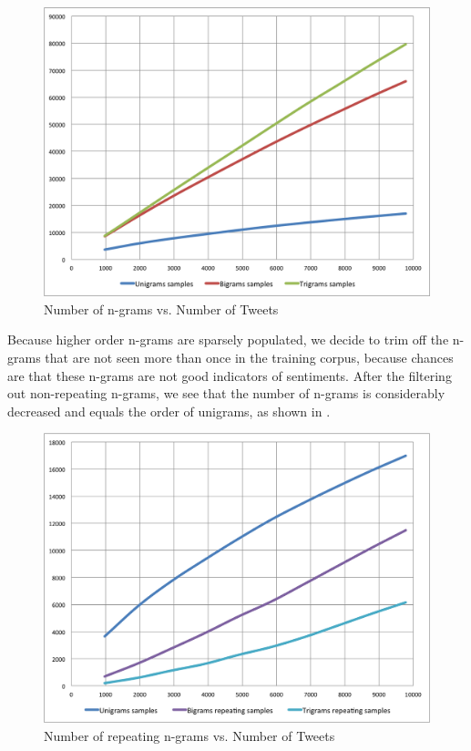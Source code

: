 \begin{figure}[h!]
\centering
\includegraphics[width=\textwidth]{img/Ngrams_dist_1.png}
\caption{Number of n-grams vs. Number of Tweets}
\label{fig:ngrams_dist_1}
\end{figure}

Because higher order n-grams are sparsely populated, we decide to trim off the n-grams that are not seen more than once in the training corpus, because chances are that these n-grams are not good indicators of sentiments. After the filtering out non-repeating n-grams, we see that the number of n-grams is considerably decreased and equals the order of unigrams, as shown in .

\begin{figure}[h!]
\centering
\includegraphics[width=\textwidth]{img/Ngrams_dist_2.png}
\caption{Number of repeating n-grams vs. Number of Tweets}
\label{fig:ngrams_dist_2}
\end{figure}

